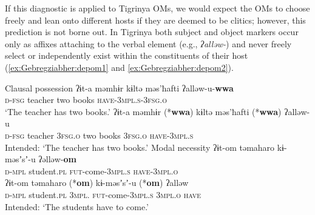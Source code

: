 \documentclass[output=paper]{langscibook}
\begin{document}
If this diagnostic is applied to Tigrinya OMs, we would expect the OMs to choose freely and lean onto different hosts if they are deemed to be clitics; however, this prediction is not borne out. In Tigrinya both subject and object markers occur only as affixes attaching to the verbal element (e.g., \emph{ʔalləw-}) and never freely select or independently exist within the constituents of their host (\ref{ex:Gebregziabher:depom1} and \ref{ex:Gebregziabher:depom2}).

\ea\label{ex:Gebregziabher:free} Clausal possession
\ea
\gll ʔɨt-a məmhɨr kɨltə məs'ħafti ʔalləw-u-{\textbf{wwa}} \hspace{15mm}  \\
{\scshape d-fsg} teacher two books {\scshape have-3mpl.s-3fsg.o}\\
\glt `The teacher has two books.'
\ex\label{ex:Gebregziabher:depom1}
\gll ʔɨt-a məmhɨr (*{\textbf{wwa}}) kɨltə məs'ħafti (*{\textbf{wwa}}) ʔalləw-u \\
{\scshape d-fsg} teacher {\scshape 3fsg.o} two books {\scshape 3fsg.o} {\scshape have-3mpl.s} \\
\glt Intended: `The teacher has two books.'
\z
\ex\label{ex:Gebregziabher:affix} Modal necessity
\ea 
\gll ʔɨt-om təmaharo kɨ-məsʼsʼ-u ʔəlləw-{\textbf{om}} \hspace{17mm}  \\
{\scshape d-mpl}  student.{\scshape pl} {\scshape fut}-come-{\scshape 3mpl.s} {\scshape have-3mpl.o} \\
\ex\label{ex:Gebregziabher:depom2}
\gll ʔɨt-om təmaharo (*{\textbf{om}}) kɨ-məsʼsʼ-u (*{\textbf{om}}) ʔalləw \\
{\scshape d-mpl}  student.{\scshape pl} {\scshape 3mpl.} {\scshape fut}-come-{\scshape 3mpl.s} {\scshape 3mpl.o} {\scshape have} \\
\glt Intended: `The students have to come.'
\z
\z
\end{document}
